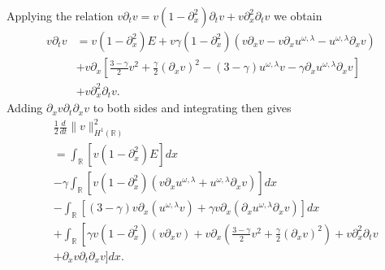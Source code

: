 \documentclass{beamer}
\newcommand{\rr}{\mathbb{R}}
\newcommand{\p}{\partial}
\begin{document}
%
\begin{frame}
	\pause
	Applying the relation $v\p_t v = v(1-\p_x^2) \p_t v + v\p_x^2 \p_t v$ we obtain
	\begin{equation*}
		\label{pre-int}
		\begin{split}
		v \p_t v &= v(1- \p_x^2)E + v\gamma(1- \p_x^2)(v\p_x v - v\p_x u^{\omega,\lambda} -
			u^{\omega,\lambda} \p_x v)
			\\
			&+ v\p_x \left[ \frac{3-\gamma}{2}v^2 + \frac{\gamma}{2}(\p_x v)^2 -
			(3-\gamma)u^{\omega,\lambda} v - \gamma \p_x u^{\omega,\lambda} \p_x v
			\right] 
		\\
		& + v\p_x^2 \p_t v.
		\end{split}
	\end{equation*}
	\pause
	Adding $\p_x v \p_t \p_x v$ to both sides and 
	integrating then gives
	\begin{equation*}
		\label{appleenergy-est*}
		\begin{split}
			&\frac{1}{2} \frac{d}{dt} \|v\|_{H^1(\rr)}^2  
			\\
		& =  \int_{\rr} \left[ v(1-\p_x^2)E \right]dx
		\\
		& - \gamma \int_{\rr} \left[ v(1-\p_x^2)(v\p_x u^{\omega,\lambda} + u^{\omega,\lambda} \p_x v) \right]dx
		\\
		&- \int_{\rr}\left[ \left( 3-\gamma \right)v \p_x\left( u^{\omega,\lambda}v \right) + \gamma v
		\p_x \left( \p_x u^{\omega,\lambda} \p_x v \right)\right]dx
		\\
		&+  \int_{\rr}
		\left[ \gamma v \left( 1-\p_x^2 \right)\left( v \p_x v \right) + v
		\p_x \left( \frac{3-\gamma}{2} v^2 + \frac{\gamma}{2}\left( \p_x v \right)^2
		\right) \right . +  v \p_x^2 \p_t v 
		\\
		& + \p_x v \p_t \p_x v\bigg]dx.
	\end{split}
\end{equation*}
\end{frame}
%
\end{document}
